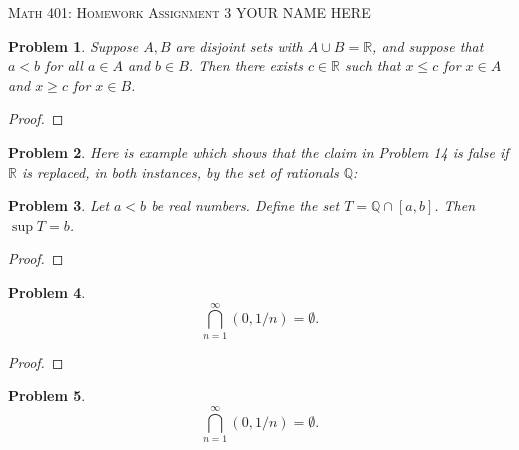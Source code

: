 \documentclass[12pt]{article}
\newtheorem{problem}{Problem}
\newcommand{\QQ}{\ensuremath{\mathbb Q}}
\newcommand{\RR}{\ensuremath{\mathbb R}}
\begin{document}
\small
\noindent \textsc{Math 401: Homework Assignment 3} \hfill YOUR NAME HERE

\normalsize
\bigskip

\setcounter{problem}{13}


\begin{problem} %
Suppose $A,B$ are disjoint sets with $A\cup B = \RR$, and suppose that $a<b$ for all $a\in A$ and $b\in B$.  Then there exists $c\in\RR$ such that $x\le c$ for $x\in A$ and $x\ge c$ for $x\in B$.
\end{problem}


\begin{proof}
\end{proof}


\begin{problem} %
Here is example which shows that the claim in Problem 14 is false if $\RR$ is replaced, in both instances, by the set of rationals $\QQ$:
\end{problem}


\begin{problem} %
Let $a<b$ be real numbers.  Define the set $T=\QQ \cap [a,b]$.  Then $\sup T = b$.
\end{problem}


\begin{proof}
\end{proof}


\begin{problem} %
    $$\bigcap_{n=1}^\infty (0,1/n)=\emptyset.$$
\end{problem}


\begin{proof}
\end{proof}


\begin{problem} %
    $$\bigcap_{n=1}^\infty (0,1/n)=\emptyset.$$
\end{problem}

\end{document}
